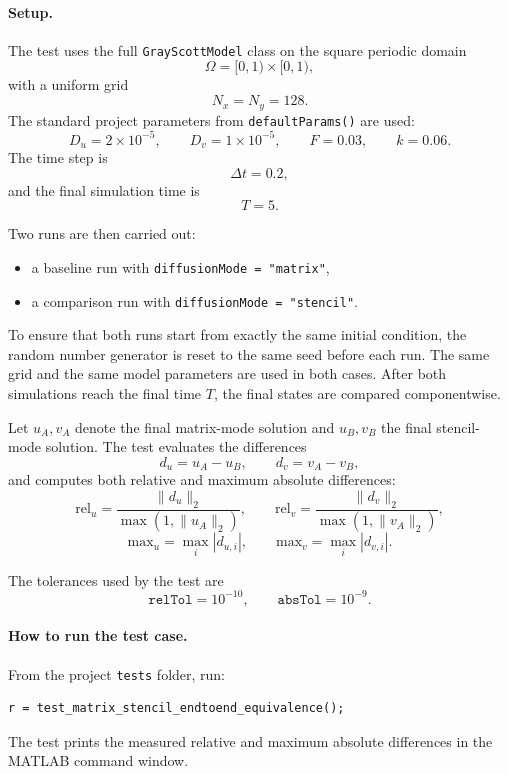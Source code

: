 \paragraph{Setup.}
The test uses the full \texttt{GrayScottModel} class on the square periodic domain
\[
\Omega = [0,1)\times[0,1),
\]
with a uniform grid
\[
N_x = N_y = 128.
\]
The standard project parameters from \texttt{defaultParams()} are used:
\[
D_u = 2\times 10^{-5}, \qquad
D_v = 1\times 10^{-5}, \qquad
F = 0.03, \qquad
k = 0.06.
\]
The time step is
\[
\Delta t = 0.2,
\]
and the final simulation time is
\[
T = 5.
\]

Two runs are then carried out:

\begin{itemize}
    \item a baseline run with \texttt{diffusionMode = "matrix"},
    \item a comparison run with \texttt{diffusionMode = "stencil"}.
\end{itemize}

To ensure that both runs start from exactly the same initial condition, the random number generator is reset to the same seed before each run. The same grid and the same model parameters are used in both cases. After both simulations reach the final time \(T\), the final states are compared componentwise.

Let \(u_A, v_A\) denote the final matrix-mode solution and \(u_B, v_B\) the final stencil-mode solution. The test evaluates the differences
\[
d_u = u_A - u_B, \qquad d_v = v_A - v_B,
\]
and computes both relative and maximum absolute differences:
\[
\mathrm{rel}_u = \frac{\|d_u\|_2}{\max(1,\|u_A\|_2)}, \qquad
\mathrm{rel}_v = \frac{\|d_v\|_2}{\max(1,\|v_A\|_2)},
\]
\[
\mathrm{max}_u = \max_i |d_{u,i}|, \qquad
\mathrm{max}_v = \max_i |d_{v,i}|.
\]

The tolerances used by the test are
\[
\texttt{relTol} = 10^{-10}, \qquad
\texttt{absTol} = 10^{-9}.
\]

\paragraph{How to run the test case.}
From the project \texttt{tests} folder, run:
\begin{verbatim}
r = test_matrix_stencil_endtoend_equivalence();
\end{verbatim}

The test prints the measured relative and maximum absolute differences in the MATLAB command window.

